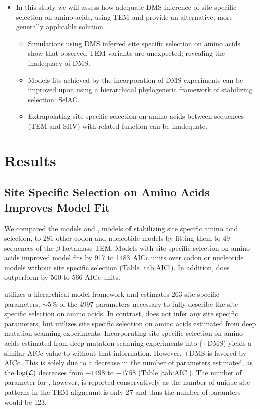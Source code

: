 \documentclass[12pt]{article}
\begin{document}
\begin{itemize}
\begin{itemize}
\begin{itemize}
		\end{itemize}
	\end{itemize}
	\item In this study we will assess how adequate DMS inference of site specific selection on amino acids, using TEM and provide an alternative, more generally applicable solution.
	\begin{itemize}
		\item Simulations using DMS inferred site specific selection on amino acids show that observed TEM variants are unexpected; revealing the inadequacy of DMS.
		\item Models fits achieved by the incorporation of DMS experiments can be improved upon using a hierarchical phylogenetic framework of stabilizing selection: SelAC.
		\item Extrapolating site specific selection on amino acids between sequences (TEM and SHV) with related function can be inadequate.
	\end{itemize}
\end{itemize}

\section*{Results}
\subsection*{Site Specific Selection on Amino Acids Improves Model Fit}
We compared the models \phydms \citep{hilton2017} and \selac \citep{beaulieu2018}, models of stabilizing site specific amino acid selection, to 281 other codon and nucleotide models by fitting them to 49 sequences of the $\beta$-lactamase TEM.
Models with site specific selection on amino acids improved model fits by 917 to 1483 AICc units over codon or nucleotide models without site specific selection (Table \ref{tab:AIC}).
In addition, \selac does outperform \phydms by 560 to  566 AICc units.

\selac utilizes a hierarchical model framework and estimates 263 site specific parameters, $\sim5\%$ of the 4997 parameters necessary to fully describe the site specific selection on amino acids.
In contrast, \phydms does not infer any site specific parameters, but utilizes site specific selection on amino acids estimated from deep mutation scanning experiments.
Incorporating site specific selection on amino acids estimated from deep mutation scanning experiments into \selac (\selac+DMS) yields a similar AICc value to \selac without that information.
However, \selac+DMS is favored by AICc.
This is solely due to a decrease in the number of parameters estimated, as the $\log(\mathcal{L})$ decreases from $-1498$ to $-1768$ (Table \ref{tab:AIC}).
The number of parameter for \selac, however, is reported conservatively as the number of unique site patterns in the TEM alignemnt is only 27 and thus the number of paramters would be 123.
\end{document}
